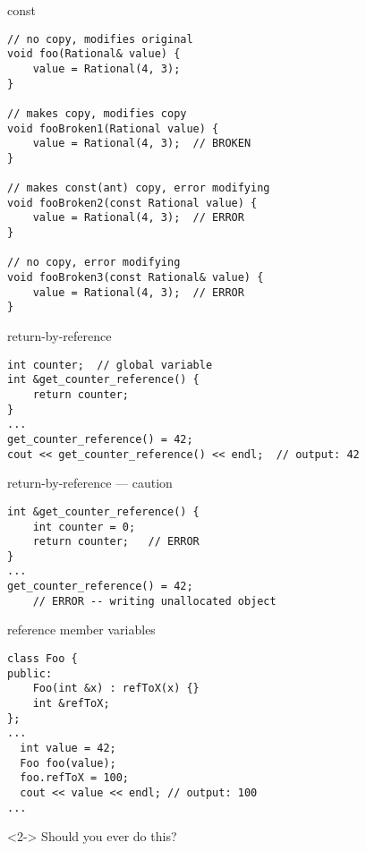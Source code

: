 \begin{frame}[fragile,label=constReferneces]{const}
\lstset{
    language=C++,
    style=smaller,
}
    \vspace{-.75cm}
\begin{lstlisting}
// no copy, modifies original 
void foo(Rational& value) { 
    value = Rational(4, 3);
}

// makes copy, modifies copy
void fooBroken1(Rational value) {  
    value = Rational(4, 3);  // BROKEN
}

// makes const(ant) copy, error modifying
void fooBroken2(const Rational value) { 
    value = Rational(4, 3);  // ERROR
}

// no copy, error modifying
void fooBroken3(const Rational& value) {
    value = Rational(4, 3);  // ERROR
}
\end{lstlisting}
\end{frame}

\begin{frame}[fragile,label=returnByRef]{return-by-reference}
\lstset{language=C++,style=small}
\begin{lstlisting}
int counter;  // global variable
int &get_counter_reference() {
    return counter;
}
...
get_counter_reference() = 42;
cout << get_counter_reference() << endl;  // output: 42
\end{lstlisting}
\end{frame}

\begin{frame}[fragile,label=returnByRefCaution]{return-by-reference --- caution}
\lstset{language=C++,style=small}
\begin{lstlisting}
int &get_counter_reference() {
    int counter = 0;
    return counter;   // ERROR
}
...
get_counter_reference() = 42; 
    // ERROR -- writing unallocated object
\end{lstlisting}
\end{frame}

\begin{frame}[fragile,label=refMemVars]{reference member variables}
\lstset{language=C++,style=small}
\begin{lstlisting}
class Foo {
public:
    Foo(int &x) : refToX(x) {}
    int &refToX;
};
...
  int value = 42;
  Foo foo(value);
  foo.refToX = 100;
  cout << value << endl; // output: 100
...
\end{lstlisting}
\begin{visibleenv}<2->
Should you ever do this? 
\end{visibleenv}
\end{frame}
